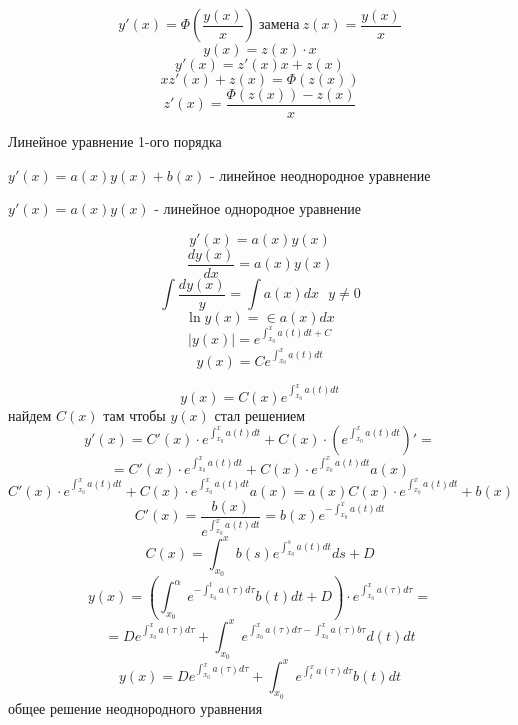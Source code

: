 \begin{block}
  $$
  y'(x) = \Phi \left( \frac{y(x)}{x} \right) ~ \text{замена} ~ z(x) =
  \frac{y(x)}{x}
  $$
  $$
  y(x) = z(x) \cdot x
  $$
  $$
  y'(x) = z'(x) x + z(x)
  $$
  $$
  x z'(x) + z(x) = \Phi(z(x))
  $$
  $$
  z'(x) = \frac{\Phi(z(x)) - z(x)}{x}
  $$
\end{block}

\begin{title}[\Large]
  Линейное уравнение 1-ого порядка
\end{title}

\begin{define}
  $y'(x) = a(x)y(x) + b(x)$ - линейное неоднородное уравнение

  $y'(x) = a(x)y(x)$ - линейное однородное уравнение
\end{define}

\begin{block}
  $$
  y'(x) = a(x)y(x)
  $$
  $$
  \frac{dy(x)}{dx} = a(x)y(x)
  $$
  $$
  \int \frac{dy(x)}{y} = \int a(x)dx ~~~ y \not= 0
  $$
  $$
  \ln y(x) = \in a(x)dx
  $$
  $$
  |y(x)| = e^{\int_{x_0}^x a(t) dt + C}
  $$
  $$
  y(x) = C e^{\int_{x_0}^x a(t) dt}
  $$
\end{block}

\begin{block}
  $$
  y(x) = C(x) e^{\int_{x_0}^x a(t) dt}
  $$
  найдем $C(x)$ там чтобы $y(x)$ стал решением
  $$
  y'(x) = C'(x) \cdot e^{\int_{x_0}^x a(t) dt} +
  C(x) \cdot \left( e^{\int_{x_0}^x a(t) dt} \right)' =
  $$
  $$
  = C'(x) \cdot e^{\int_{x_0}^x a(t) dt} +
  C(x) \cdot e^{\int_{x_0}^x a(t) dt} a(x)
  $$
  $$
  C'(x) \cdot e^{\int_{x_0}^x a(t) dt} +
  C(x) \cdot e^{\int_{x_0}^x a(t) dt} a(x) =
  a(x) C(x) \cdot e^{\int_{x_0}^x a(t) dt} + b(x)
  $$
  $$
  C'(x) = \frac{b(x)}{e^{\int_{x_0}^x a(t) dt}} =
  b(x) e^{-\int_{x_0}^x a(t) dt}
  $$
  $$
  C(x) = \int_{x_0}^x b(s) e^{\int_{x_0}^s a(t) dt} ds + D
  $$
  $$
  y(x) = \left( \int_{x_0}^{\alpha} e^{-\int_{x_0}^t a(\tau) d\tau}
  b(t)dt + D \right) \cdot e^{\int_{x_0}^x a(\tau) d\tau} =
  $$
  $$
  = D e^{\int_{x_0}^x a(\tau) d\tau} + \int_{x_0}^x
  e^{\int_{x_0}^x a(\tau) d\tau - \int_{x_0}^x a(\tau) b\tau} d(t)dt
  $$
  $$
  y(x) = D e^{\int_{x_0}^x a(\tau) d\tau} + \int_{x_0}^x
  e^{\int_{t}^x a(\tau) d\tau} b(t)dt
  $$
  общее решение неоднородного уравнения
\end{block}

